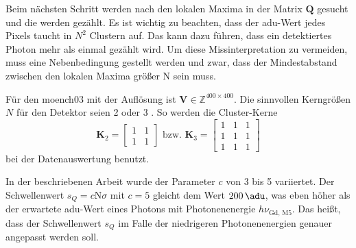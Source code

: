 \noindent
Beim nächsten Schritt werden nach den lokalen Maxima in der Matrix $\mathbf{Q}$ gesucht und die werden gezählt. Es ist wichtig zu beachten, dass der \gls{adu}-Wert jedes Pixels taucht in $N^2$ Clustern auf. Das kann dazu führen, dass ein detektiertes Photon mehr als einmal gezählt wird. Um diese Missinterpretation zu vermeiden, muss eine Nebenbedingung gestellt werden und zwar, dass der Mindestabstand zwischen den lokalen Maxima größer N sein muss.

\noindent
Für den \gls{moench03} mit der Auflösung  ist $\mathbf{V} \in \mathbb{Z}^{400\times 400}$. Die sinnvollen Kerngrößen $N$ für den Detektor seien 2 oder 3 \cite[Abschnitt 4]{cartier_micron_2014}. So werden die Cluster-Kerne
\begin{equation}
    \mathbf{K}_{2} = \begin{bmatrix}
1 & 1\\
1 & 1
\end{bmatrix}
\text{ bzw. }
    \mathbf{K}_{3} = \begin{bmatrix}
1 & 1 & 1\\
1 & 1 & 1\\
1 & 1 & 1
\end{bmatrix}
\end{equation}
bei der Datenauswertung benutzt.

\noindent
In der beschriebenen Arbeit wurde der Parameter $c$ von 3 bis 5 variiertet. Der Schwellenwert $s_Q = c\text{N}\sigma$ mit $c=5$ gleicht dem Wert $\SI{200}{\adu}$, was eben höher als der erwartete \gls{adu}-Wert eines Photons mit Photonenenergie $h\nu_\text{Gd, M5}$. Das heißt, dass der Schwellenwert $s_Q$ im Falle der niedrigeren Photonenenergien genauer angepasst werden soll.